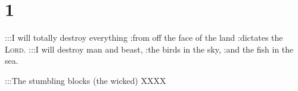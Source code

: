 \section{1}
\begin{enumerate}[align=center]
     :::I will totally destroy everything :from off the face of the land :dictates the \textsc{Lord}.%
     :::I will destroy man and beast, :the birds in the sky, :and the fish in the sea.%
    
    :::The stumbling blocks (the wicked) XXXX%
\end{enumerate}
